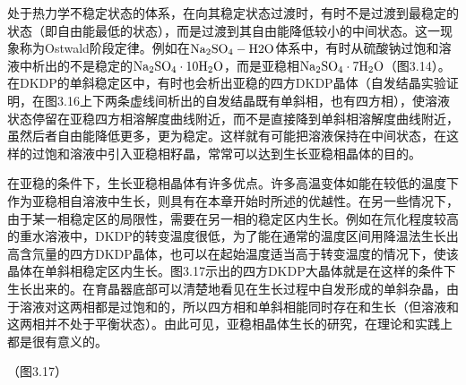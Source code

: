 处于热力学不稳定状态的体系，在向其稳定状态过渡时，有时不是过渡到最稳定的状态（即自由能最低的状态），而是过渡到其自由能降低较小的中间状态。这一现象称为Ostwald阶段定律。例如在$\rm Na_2SO_4-H2O$体系中，有时从硫酸钠过饱和溶液中析出的不是稳定的$\rm Na_2SO_4\cdot 10H_2O$，而是亚稳相$\rm Na_2SO_4\cdot 7H_2O$（图3.14）。在DKDP的单斜稳定区中，有时也会析出亚稳的四方DKDP晶体（自发结晶实验证明，在图3.16上下两条虚线间析出的自发结晶既有单斜相，也有四方相），使溶液状态停留在亚稳四方相溶解度曲线附近，而不是直接降到单斜相溶解度曲线附近，虽然后者自由能降低更多，更为稳定。这样就有可能把溶液保持在中间状态，在这样的过饱和溶液中引入亚稳相籽晶，常常可以达到生长亚稳相晶体的目的。

在亚稳的条件下，生长亚稳相晶体有许多优点。许多高温变体如能在较低的温度下作为亚稳相自溶液中生长，则具有在本章开始时所述的优越性。在另一些情况下，由于某一相稳定区的局限性，需要在另一相的稳定区内生长。例如在氘化程度较高的重水溶液中，DKDP的转变温度很低，为了能在通常的温度区间用降温法生长出高含氘量的四方DKDP晶体，也可以在起始温度适当高于转变温度的情况下，使该晶体在单斜相稳定区内生长。图3.17示出的四方DKDP大晶体就是在这样的条件下生长出来的。在育晶器底部可以清楚地看见在生长过程中自发形成的单斜杂晶，由于溶液对这两相都是过饱和的，所以四方相和单斜相能同时存在和生长（但溶液和这两相并不处于平衡状态）。由此可见，亚稳相晶体生长的研究，在理论和实践上都是很有意义的。

（图3.17）

